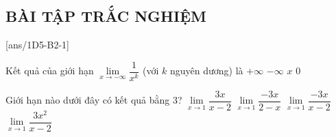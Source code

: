 \subsection{BÀI TẬP TRẮC NGHIỆM}
\TN
\setcounter{ex}{0}
[ans/1D5-B2-1]
\begin{ex}%
	Kết quả của giới hạn 
	$\lim \limits_{x \rightarrow-\infty} \dfrac{1}{x^k}$ (với $k$ nguyên dương) là
	\choice
	{$+\infty$}
	{$-\infty$}
	{$x$}
	{\True $0$ }
\end{ex}

\begin{ex}%
	Giới hạn nào dưới đây có kết quả bằng $3$?
	\choice
	{$\lim \limits_{x \rightarrow 1} \dfrac{3 x}{x-2}$}
	{$\lim \limits_{x \rightarrow 1} \dfrac{-3 x}{2-x}$}
	{\True $\lim \limits_{x \rightarrow 1} \dfrac{-3 x}{x-2}$}
	{$\lim \limits_{x \rightarrow 1} \dfrac{3 x^2}{x-2}$}
	
\end{ex}

